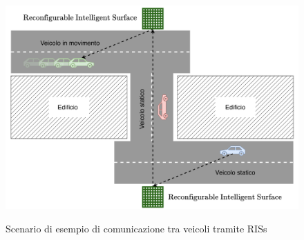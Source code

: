 \begin{figure}
  \centering
  \def\stackalignment{l}{ \includegraphics[width=\linewidth]{images/examples/ris-intersection.png} }
  \caption{Scenario di esempio di comunicazione tra veicoli tramite RISs}
  \label{fig:example-ris-scenario}
  \vspace{1em}
\end{figure}

